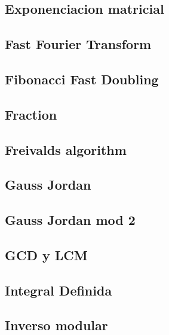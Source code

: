 \subsection{Exponenciacion matricial}
\raggedbottom
\hrulefill
\subsection{Fast Fourier Transform}
\raggedbottom
\hrulefill
\subsection{Fibonacci Fast Doubling}
\raggedbottom
\hrulefill
\subsection{Fraction}
\raggedbottom
\hrulefill
\subsection{Freivalds algorithm}
\raggedbottom
\hrulefill
\subsection{Gauss Jordan}
\raggedbottom
\hrulefill
\subsection{Gauss Jordan mod 2}
\raggedbottom
\hrulefill
\subsection{GCD y LCM}
\raggedbottom
\hrulefill
\subsection{Integral Definida}
\raggedbottom
\hrulefill
\subsection{Inverso modular}
\raggedbottom
\hrulefill
